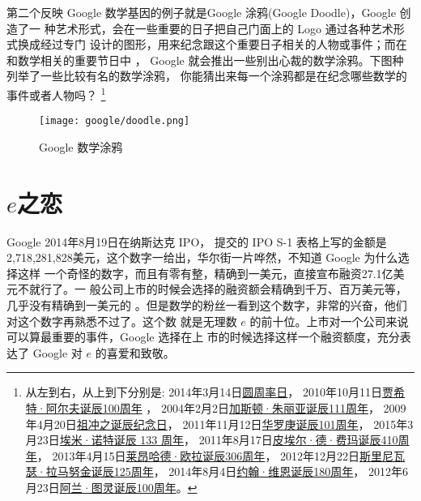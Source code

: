 第二个反映 Google 数学基因的例子就是Google 涂鸦(Google Doodle)，Google 创造了一
种艺术形式，会在一些重要的日子把自己门面上的 Logo 通过各种艺术形式换成经过专门
设计的图形，用来纪念跟这个重要日子相关的人物或事件；而在和数学相关的重要节日中
， Google 就会推出一些别出心裁的数学涂鸦。下图种列举了一些比较有名的数学涂鸦，
你能猜出来每一个涂鸦都是在纪念哪些数学的事件或者人物吗？
\footnote{
从左到右，从上到下分别是:
2014年3月14日\href{http://www.google.com/doodles/pi-day?hl=zh-CN}{圆周率日}，
2010年10月11日\href{http://www.google.com/doodles/cahit-arfs-100th-birthday?hl=zh-CN}{贾希特·阿尔夫诞辰100周年} ，
2004年2月2日\href{http://www.google.com/doodles/gaston-julias-111th-birthday?hl=zh-CN}{加斯顿·朱丽亚诞辰111周年}，
2009年4月20日\href{http://www.google.com/doodles/zu-chongzhis-birthday?hl=zh-CN}{祖冲之诞辰纪念日}，
2011年11月12日\href{http://www.google.com/doodles/hua-luogengs-101st-birthday?hl=zh-CN}{华罗庚诞辰101周年}，
2015年3月23日\href{http://www.google.com/doodles/emmy-noethers-133rd-birthday?hl=zh-CN}{埃米·诺特诞辰 133 周年}，
2011年8月17日\href{http://www.google.com/doodles/pierre-de-fermats-410th-birthday?hl=zh-CN}{皮埃尔·德·费玛诞辰410周年}，
2013年4月15日\href{http://www.google.com/doodles/leonhard-eulers-306th-birthday?hl=zh-CN}{莱昂哈德·欧拉诞辰306周年}，
2012年12月22日\href{http://www.google.com/doodles/srinivasa-ramanujans-125th-birthday?hl=zh-CN}{斯里尼瓦瑟·拉马努金诞辰125周年}，
2014年8月4日\href{http://www.google.com/doodles/john-venns-180th-birthday?hl=zh-CN}{约翰·维恩诞辰180周年}，
2012年6月23日\href{http://www.google.com/doodles/alan-turings-100th-birthday?hl=zh-CN}{阿兰·图灵诞辰100周年}。
}

\begin{figure}[htbp]
\centering
\texttt{[image: google/doodle.png]}
\caption{Google 数学涂鸦}
\centering
\end{figure}

\section{$e$之恋}

Google 2014年8月19日在纳斯达克 IPO， 提交的 IPO S-1 表格上写的金额是
2,718,281,828美元，这个数字一给出，华尔街一片哗然，不知道 Google 为什么选择这样
一个奇怪的数字，而且有零有整，精确到一美元，直接宣布融资27.1亿美元不就行了。一
般公司上市的时候会选择的融资额会精确到千万、百万美元等，几乎没有精确到一美元的
。但是数学的粉丝一看到这个数字，非常的兴奋，他们对这个数字再熟悉不过了。这个数
就是无理数 $e$ 的前十位。上市对一个公司来说可以算最重要的事件，Google 选择在上
市的时候选择这样一个融资额度，充分表达了 Google 对 $e$ 的喜爱和致敬。

